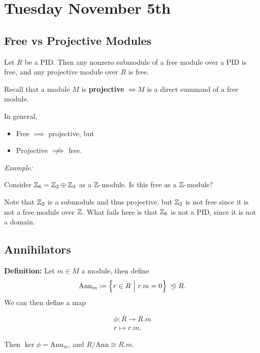 \hypertarget{tuesday-november-5th}{%
\section{Tuesday November 5th}\label{tuesday-november-5th}}

\hypertarget{free-vs-projective-modules}{%
\subsection{Free vs Projective
Modules}\label{free-vs-projective-modules}}

Let \(R\) be a PID. Then any nonzero submodule of a free module over a
PID is free, and any projective module over \(R\) is free.

Recall that a module \(M\) is \textbf{projective} \(\iff M\) is a direct
summand of a free module.

In general,

\begin{itemize}
\item
  Free \(\implies\) projective, but
\item
  Projective \(\centernot\implies\) free.
\end{itemize}

\emph{Example:}

Consider \({\mathbb{Z}}_6 = {\mathbb{Z}}_2 \oplus {\mathbb{Z}}_3\) as a \({\mathbb{Z}}{\hbox{-}}\)module. Is this
free as a \({\mathbb{Z}}{\hbox{-}}\)module?

Note that \({\mathbb{Z}}_2\) is a submodule and thus projective, but \({\mathbb{Z}}_2\) is
not free since it is not a free module over \({\mathbb{Z}}\). What fails here is
that \({\mathbb{Z}}_6\) is not a PID, since it is not a domain.

\hypertarget{annihilators}{%
\subsection{Annihilators}\label{annihilators}}

\textbf{Definition:} Let \(m\in M\) a module, then define
\begin{align*}
\mathrm{Ann}_m \coloneqq \left\{{r\in R {~\mathrel{\Big|}~} r.m = 0 }\right\} {~\trianglelefteq~} R.
\end{align*} We can then define a map

\begin{align*}
\phi: R \to R.m \\
r \mapsto r.m
.\end{align*}

Then \(\ker \phi = \mathrm{Ann}_m\), and \(R/\mathrm{Ann} \cong R.m\).

